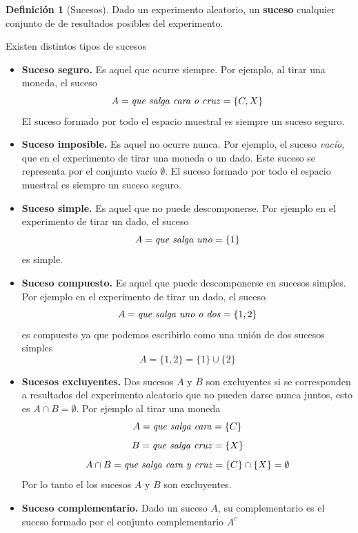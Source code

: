 \documentclass[]{book}
\theoremstyle{plain}
\theoremstyle{definition}
\newtheorem{definition}[theorem]{Definición}
\theoremstyle{definition} %
\begin{document}
\begin{definition}[Sucesos]
  Dado un experimento aleatorio, un \textbf{suceso}  cualquier conjunto de de resultados posibles del experimento.

Existen distintos tipos de sucesos

\begin{itemize}
  \item \textbf{Suceso seguro.} Es aquel que ocurre siempre. Por ejemplo, al tirar  una moneda, el suceso 
  \[A=\text{\emph{que salga cara o cruz}} = \{C, X\}\]
  El suceso formado por todo el espacio muestral es siempre un suceso seguro.
  
  \item \textbf{Suceso imposible.} Es aquel no ocurre nunca. Por ejemplo,  el suceso \emph{vacío},
  que en el experimento de tirar una moneda o un dado. Este suceso se representa por el conjunto vacío $\emptyset$.
  El suceso formado por todo el espacio muestral es siempre un suceso seguro.

  \item \textbf{Suceso simple.} Es aquel que no puede descomponerse. Por ejemplo en el experimento de tirar un dado, el suceso
  \[A=\text{\emph{que salga uno}} = \{1\}\]
  es simple.
  \item \textbf{Suceso compuesto.}  Es aquel que puede descomponerse en sucesos simples. Por ejemplo en el experimento de tirar un dado, el suceso
  \[A=\text{\emph{que salga uno o dos}} = \{1, 2\}\]
  es compuesto ya que podemos escribirlo como una unión de dos sucesos simples
  \[A= \{1, 2\} = \{1\} \cup \{2\}\]
  \item \textbf{Sucesos excluyentes.}  Dos sucesos $A$ y $B$ son excluyentes si se corresponden a resultados del experimento aleatorio que no pueden 
  darse nunca juntos, esto es $A\cap B = \emptyset$. Por ejemplo al tirar una moneda 
  \[A=\text{\emph{que salga cara}} = \{C\}\]
  \[B=\text{\emph{que salga cruz}} = \{X\}\]
  \[A\cap B=\text{\emph{que salga cara y cruz}} = \{C\} \cap \{X\} = \emptyset\]
  Por lo tanto el los sucesos $A$ y $B$ son excluyentes.
  \item  \textbf{Suceso complementario.} Dado un suceso $A$, su complementario es el suceso formado 
  por el conjunto complementario $A^c$
\end{itemize}

\end{definition}
\end{document}
